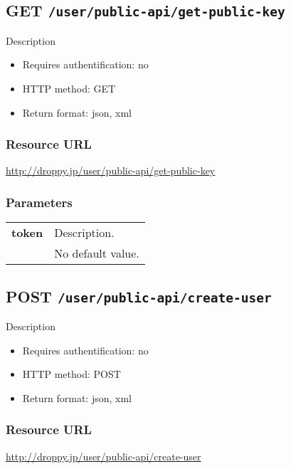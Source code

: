 \documentclass[11pt,a4paper]{article}
\newcommand{\content}[1]{\begin{minipage}{10cm}\vspace{2mm}#1\vspace{2mm}\end{minipage}}
\begin{document}
      
  \subsection*{GET {\tt /user/public-api/get-public-key}}
  Description
  \begin{itemize}
  \item Requires authentification: no
  \item HTTP method: GET
  \item Return format: json, xml
  \end{itemize}
  \subsubsection*{Resource URL}
  \url{http://droppy.jp/user/public-api/get-public-key}
  \subsubsection*{Parameters}
  \begin{table}[h]
    \begin{center}
      \begin{tabular}{l l}
        \hline 
      \textbf{token} & \content{Description. }
      \\
       & No default value.\\
      \hline
      \end{tabular}
    \end{center}
  \end{table}
  
      \newpage
      
      
  \subsection*{POST {\tt /user/public-api/create-user}}
  Description
  \begin{itemize}
  \item Requires authentification: no
  \item HTTP method: POST
  \item Return format: json, xml
  \end{itemize}
  \subsubsection*{Resource URL}
  \url{http://droppy.jp/user/public-api/create-user}
\end{document}
